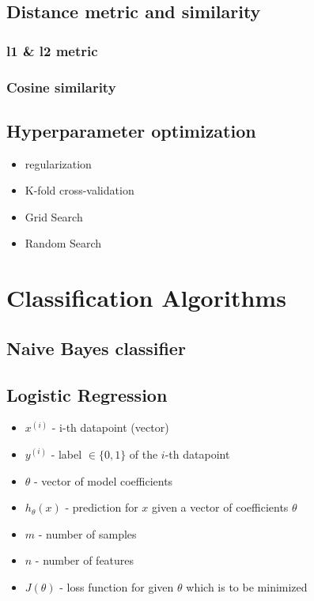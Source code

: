 \subsection{Distance metric and similarity}
\subsubsection{l1 \& l2 metric}
\smallskip
\subsubsection{Cosine similarity}
\smallskip

\subsection{Hyperparameter optimization}
\begin{itemize}
    \item regularization
    \item K-fold cross-validation
    \item Grid Search
    \item Random Search
\end{itemize}

\section{Classification Algorithms}

\subsection{Naive Bayes classifier}
\smallskip

\subsection{Logistic Regression}
\begin{itemize}
    \item $x^{(i)}$ - i-th datapoint (vector)
    \item $y^{(i)}$ - label $\in \{0, 1\}$ of the $i$-th datapoint
    \item $\theta$ - vector of model coefficients
    \item $h_\theta(x)$ - prediction for $x$ given a vector of coefficients $\theta$
    \item $m$ - number of samples
    \item $n$ - number of features
    \item $J(\theta)$ - loss function for given $\theta$ which is to be minimized
\end{itemize}

